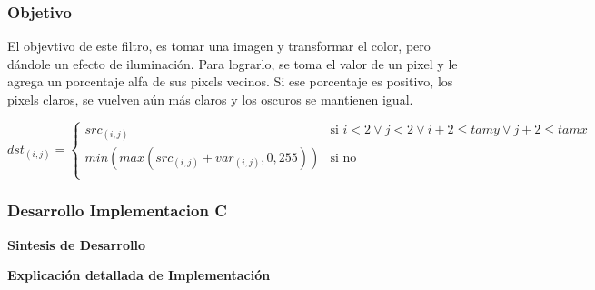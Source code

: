 \vspace*{0.3cm} \noindent
\subsubsection{Objetivo}

El objevtivo de este filtro, es tomar una imagen y transformar el color, pero dándole un efecto de iluminación. \newline
Para lograrlo, se toma el valor de un pixel y le agrega un porcentaje alfa de sus pixels vecinos. \newline
Si ese porcentaje es positivo, los pixels claros, se vuelven aún más claros y los oscuros se mantienen igual.\newline

       
\[ dst_{(i,j)} = \left\{ \begin{array}{ll}
         src_{(i,j)} & \mbox{si $i < 2 \vee j < 2 \vee i + 2 \leq tamy \vee j + 2 \leq tamx  $}\\
        min(max(src_{(i,j)} + var_{(i,j)},0, 255)) & \mbox{si no}\\\end{array} \right. \]       

\vspace*{0.3cm} \noindent

\subsubsection{Desarrollo Implementacion C}

\begin{center}
\textbf{Sintesis de Desarrollo} 
\end{center}


\begin{center}
\textbf{Explicación detallada de Implementación}

\end{center}

